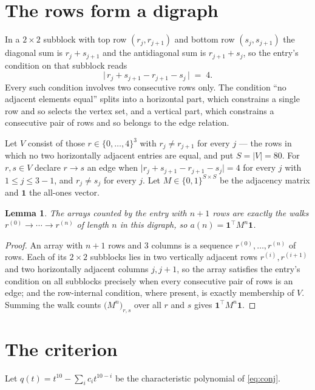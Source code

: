 \documentclass[11pt,a4paper]{article}
\theoremstyle{plain}
\newtheorem{lemma}[theorem]{Lemma}
\theoremstyle{definition}
\begin{document}
\section{The rows form a digraph}

In a $2\times2$ subblock with top row $(r_j,r_{j+1})$ and bottom row $(s_j,s_{j+1})$ the
diagonal sum is $r_j+s_{j+1}$ and the antidiagonal sum is $r_{j+1}+s_j$, so the entry's
condition on that subblock reads
\[
\bigl|\,r_j+s_{j+1}-r_{j+1}-s_j\,\bigr|\;=\;4.
\]
Every such condition involves two consecutive rows only. The condition ``no adjacent elements equal'' splits into a horizontal
part, which constrains a single row and so selects the vertex set, and a vertical part,
which constrains a consecutive pair of rows and so belongs to the edge relation.

Let $V$ consist of those $r\in\{0,\dots,4\}^{3}$ with $r_j\ne r_{j+1}$ for every
$j$ --- the rows in which no two horizontally adjacent entries are equal, and put $S=|V|=80$. For $r,s\in V$ declare $r\to s$ an edge
when $\bigl|r_j+s_{j+1}-r_{j+1}-s_j\bigr|=4$ for every $j$ with
$1\le j\le3-1$, and $r_j\ne s_j$ for every $j$. Let $M\in\{0,1\}^{S\times S}$ be the adjacency matrix and $\mathbf{1}$
the all-ones vector.

\begin{lemma}\label{lem:walk}
The arrays counted by the entry with $n+1$ rows are exactly the walks
$r^{(0)}\to\cdots\to r^{(n)}$ of length $n$ in this digraph, so
$a(n)=\mathbf{1}^{\!\top}M^{n}\mathbf{1}$.
\end{lemma}

\begin{proof}
An array with $n+1$ rows and $3$ columns is a sequence $r^{(0)},\dots,r^{(n)}$ of
rows. Each of its $2\times2$ subblocks lies in two vertically adjacent rows
$r^{(i)},r^{(i+1)}$ and two horizontally adjacent columns $j,j+1$, so the array satisfies
the entry's condition on all subblocks precisely when every consecutive pair of rows is an
edge; and the row-internal condition, where present, is exactly membership of $V$. Summing
the walk counts $\bigl(M^{n}\bigr)_{r,s}$ over all $r$ and $s$ gives
$\mathbf{1}^{\!\top}M^{n}\mathbf{1}$.
\end{proof}

\section{The criterion}

Let $q(t)=t^{10}-\sum_i c_i t^{10-i}$ be the characteristic polynomial of
\eqref{eq:conj}.
\end{document}
